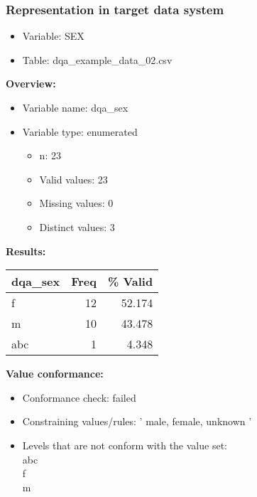 \documentclass[
]{article}
\providecommand{\tightlist}{%
  \setlength{\itemsep}{0pt}\setlength{\parskip}{0pt}}
\begin{document}
\newpage

\hypertarget{representation-in-target-data-system-11}{%
\subsubsection{\texorpdfstring{Representation in \textbf{target} data
system}{Representation in target data system}}\label{representation-in-target-data-system-11}}

\begin{itemize}
\tightlist
\item
  Variable: SEX
\item
  Table: dqa\_example\_data\_02.csv
\end{itemize}

\textbf{Overview:}

\begin{itemize}
\tightlist
\item
  Variable name: dqa\_sex
\item
  Variable type: enumerated

  \begin{itemize}
  \tightlist
  \item
    n: 23
  \item
    Valid values: 23
  \item
    Missing values: 0
  \item
    Distinct values: 3
  \end{itemize}
\end{itemize}

\textbf{Results:}\\

\begin{table}[H]
\centering
\begin{tabular}{l|r|r}
\hline
\textbf{dqa\_sex} & \textbf{Freq} & \textbf{\% Valid}\\
\hline
f & 12 & 52.174\\
\hline
m & 10 & 43.478\\
\hline
abc & 1 & 4.348\\
\hline
\end{tabular}
\end{table}

\textbf{Value conformance:}

\begin{itemize}
\tightlist
\item
  Conformance check: failed
\item
  Constraining values/rules: ' male, female, unknown '
\item
  Levels that are not conform with the value set:\\
  abc\\
  f\\
  m
\end{itemize}
\end{document}
